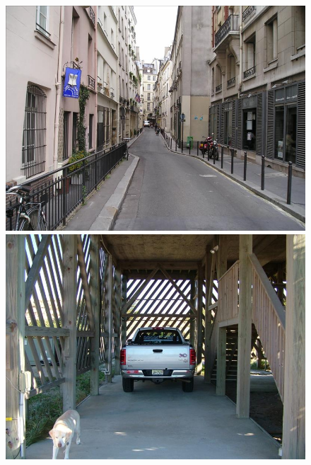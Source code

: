 \documentclass{article}
\begin{document}
\begin{figure}[h]
\begin{minipage}{0.24\textwidth}
		\label{fig:gates}
	\end{minipage}
	\begin{minipage}{0.24\textwidth}
		\centering
		\includegraphics[width=\textwidth]{../fig/background3}
	\end{minipage}
	\begin{minipage}{0.24\textwidth}
		\centering
		\includegraphics[width=\textwidth]{../fig/background2}
	\end{minipage}
		\begin{minipage}{0.24\textwidth}
			\centering

\end{minipage}
\end{figure}
\end{document}
